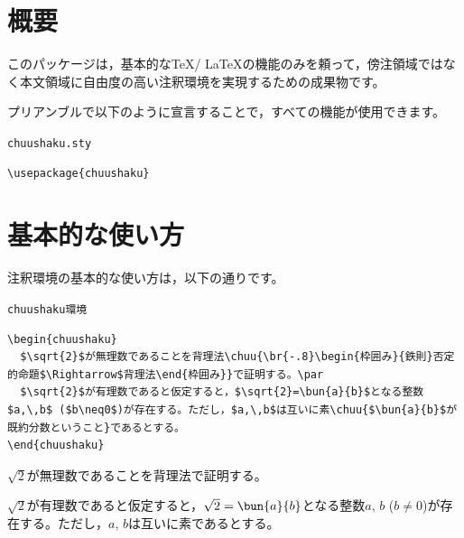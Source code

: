 \documentclass[dvipdfmx,b5j,10pt]{jsarticle}%
\title{\pl{chuushaku.sty}}%
\author{\pl{Hugh}}%
\begin{document}
%

\maketitle%

\section{概要}

このパッケージは，基本的な\TeX / \LaTeX の機能のみを頼って，傍注領域ではなく本文領域に自由度の高い注釈環境を実現するための成果物です。

プリアンブルで以下のように宣言することで，すべての機能が使用できます。

\begin{itembox}[c]{\texttt{chuushaku.sty}}
\begin{verbatim}
\usepackage{chuushaku}
\end{verbatim}
\end{itembox}

\section{基本的な使い方}

注釈環境の基本的な使い方は，以下の通りです。

\begin{itembox}[c]{\texttt{chuushaku環境}}
\begin{verbatim}
\begin{chuushaku}
  $\sqrt{2}$が無理数であることを背理法\chuu{\br{-.8}\begin{枠囲み}{鉄則}否定的命題$\Rightarrow$背理法\end{枠囲み}}で証明する。\par
  $\sqrt{2}$が有理数であると仮定すると，$\sqrt{2}=\bun{a}{b}$となる整数$a,\,b$ ($b\neq0$)が存在する。ただし，$a,\,b$は互いに素\chuu{$\bun{a}{b}$が既約分数ということ}であるとする。
\end{chuushaku}
\end{verbatim}
\end{itembox}
\begin{結果}
\begin{chuushaku}
  $\sqrt{2}$が無理数であることを背理法で証明する。\par
  $\sqrt{2}$が有理数であると仮定すると，$\sqrt{2}=\bun{a}{b}$となる整数$a,\,b$ ($b\neq0$)が存在する。ただし，$a,\,b$は互いに素であるとする。
\end{chuushaku}
\end{結果}
\end{document}
